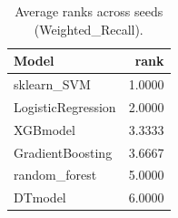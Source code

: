 \begin{table}[t]
\centering
\begin{tabular}{lr}
\toprule
Model & rank \\
\midrule
sklearn_SVM & 1.0000 \\
LogisticRegression & 2.0000 \\
XGBmodel & 3.3333 \\
GradientBoosting & 3.6667 \\
random_forest & 5.0000 \\
DTmodel & 6.0000 \\
\bottomrule
\end{tabular}
\caption{Average ranks across seeds (Weighted_Recall).}
\label{tab:avg_rank_Weighted_Recall}
\end{table}